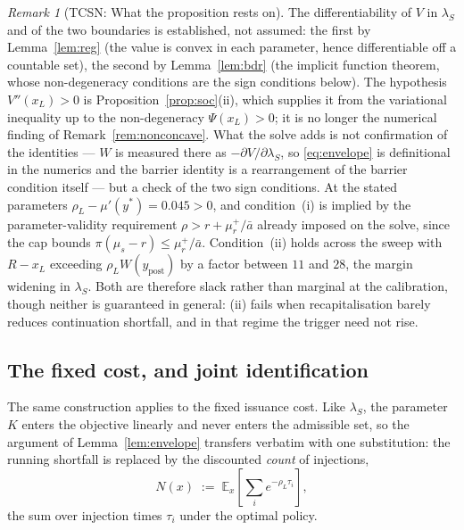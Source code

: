 \documentclass[11pt]{article}
\theoremstyle{remark}
\newtheorem{remark}{Remark}
\begin{document}
\begin{remark}[TCSN: What the proposition rests on]
\label{rem:tcsn}
The differentiability of $V$ in $\lambda_S$ and of the two boundaries is
established, not assumed: the first by Lemma~\ref{lem:reg} (the
value is convex in each parameter, hence differentiable off a countable
set), the second by Lemma~\ref{lem:bdr} (the implicit function theorem,
whose non-degeneracy conditions are the sign conditions below). The
hypothesis $V''(x_L)>0$ is Proposition~\ref{prop:soc}(ii), which supplies
it from the variational inequality up to the non-degeneracy $\Psi(x_L)>0$;
it is no longer the numerical finding of Remark~\ref{rem:nonconcave}. What
the solve adds is not confirmation of the identities --- $W$ is measured
there as $-\partial V/\partial\lambda_S$, so \eqref{eq:envelope} is
definitional in the numerics and the barrier identity is a rearrangement
of the barrier condition itself --- but a check of the two sign
conditions. At the stated parameters $\rho_L - \mu'(y^*) = 0.045 > 0$, and
condition~(i) is implied by the parameter-validity requirement
$\rho > r + \mu_r^+/\bar a$ already imposed on the solve, since the cap
bounds $\pi(\mu_s-r) \le \mu_r^+/\bar a$. Condition~(ii) holds across the
sweep with $R-x_L$ exceeding $\rho_L W(y_{\mathrm{post}})$ by a factor
between $11$ and $28$, the margin widening in $\lambda_S$. Both are
therefore slack rather than marginal at the calibration, though neither is
guaranteed in general: (ii) fails when recapitalisation barely reduces
continuation shortfall, and in that regime the trigger need not rise.
\end{remark}

\subsection{The fixed cost, and joint identification}
\label{sec:kcs}

The same construction applies to the fixed issuance cost. Like $\lambda_S$,
the parameter $K$ enters the objective linearly and never enters the
admissible set, so the argument of Lemma~\ref{lem:envelope} transfers
verbatim with one substitution: the running shortfall is replaced by the
discounted \emph{count} of injections,
\begin{equation}
N(x) \;:=\; \mathbb{E}_x\!\left[\sum_{i} e^{-\rho_L \tau_i}\right],
\label{eq:Ndef}
\end{equation}
the sum over injection times $\tau_i$ under the optimal policy.
\end{document}
